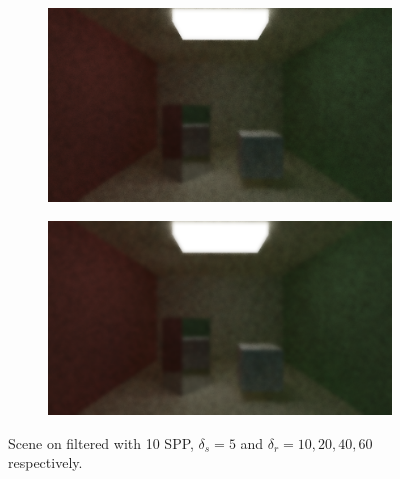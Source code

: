 \documentclass[titlepage,12pt]{report}
\begin{document}
\begin{figure}[H]
	\begin{subfigure}{.48\textwidth}
		\centering
		\includegraphics[scale=0.2]{media/bilateral/cornell_normal_10_bilateral_filter_21_5_40.png}
		\label{bilateral_filter_3}
	\end{subfigure}
	\begin{subfigure}{.48\textwidth}
		\centering
		\includegraphics[scale=0.2]{media/bilateral/cornell_normal_10_bilateral_filter_21_5_60.png}
		\label{bilateral_filter_4}
	\end{subfigure}
	\caption{Scene on filtered with 10 SPP, $\delta_s = 5$ and $\delta_r = 10, 20, 40, 60$ respectively.}
	\label{bilateral_filter_01}
\end{figure}
\end{document}
